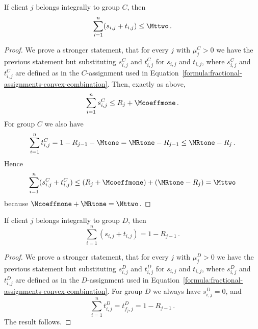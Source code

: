 \begin{lemma}
    \label{lem:tran-C}
    If client $j$ belongs integrally to group $C$, then
    \begin{equation*}
        \sum_{i=1}^n (s_{i,j} + t_{i,j}) \leq \Mttwo\,.
    \end{equation*}
\end{lemma}
\begin{proof}
    We prove a stronger statement, that for every $j$ with $\mu_j^C > 0$ we have the previous statement but substituting $s_{i,j}^C$ and $t_{i,j}^C$ for $s_{i,j}$ and $t_{i,j}$, where $s_{i,j}^C$ and $t_{i,j}^C$ are defined as in the $C$-assignment used in Equation~\ref{formula:fractional-assignments-convex-combination}.
    Then, exactly as above,
    \begin{equation*}
        \sum_{i=1}^n s_{i,j}^C \le R_j + \Mcoeffmone\,.
    \end{equation*}
    For group $C$ we also have
    \begin{equation*}
        \sum_{i=1}^n t_{i,j}^C = 1-R_{j-1}-\Mtone = \MRtone-R_{j-1} \le \MRtone-R_j\,.
    \end{equation*}
    Hence
    \begin{equation*}
        \sum_{i=1}^n (s_{i,j}^C+t_{i,j}^C) \le (R_j+\Mcoeffmone) + (\MRtone-R_j) = \Mttwo
    \end{equation*}
    because $\Mcoeffmone + \MRtone = \Mttwo$.
\end{proof}

\begin{lemma}
    \label{lem:tran-D}
    If client $j$ belongs integrally to group $D$, then
    \begin{equation*}
        \sum_{i=1}^n (s_{i,j} + t_{i,j}) = 1 - R_{j-1}\,.
    \end{equation*}
\end{lemma}
\begin{proof}
    We prove a stronger statement, that for every $j$ with $\mu_j^D > 0$ we have the previous statement but substituting $s_{i,j}^D$ and $t_{i,j}^D$ for $s_{i,j}$ and $t_{i,j}$, where $s_{i,j}^D$ and $t_{i,j}^D$ are defined as in the $D$-assignment used in Equation~\ref{formula:fractional-assignments-convex-combination}.
    For group $D$ we always have $s_{i,j}^D=0$, and
    \begin{equation*}
        \sum_{i=1}^n t_{i,j}^D = t_{f_j,j}^D = 1-R_{j-1}\,.
    \end{equation*}
    The result follows.
\end{proof}

